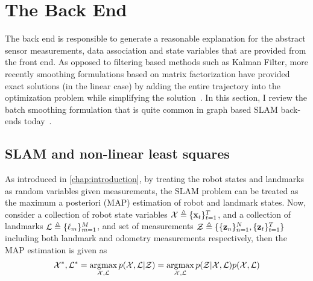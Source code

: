 \section{The Back End}

The back end is responsible to generate a reasonable explanation for the abstract sensor measurements, data association and state variables that are provided from the front end. As opposed to filtering based methods such as Kalman Filter, more recently smoothing formulations based on matrix factorization have provided exact solutions (in the linear case) by adding the entire trajectory into the optimization problem while simplifying the solution~\cite{kaessIncrementalSmoothingMapping}. In this section, I review the batch smoothing formulation that is quite common in graph based SLAM back-ends today~\cite{grisettiTutorialGraphBasedSLAM, dellaertFactorGraphsRobot2017}.

\subsection{SLAM and non-linear least squares}

As introduced in \ref{chap:introduction}, by treating the robot states and landmarks as random variables given measurements, the SLAM problem can be treated as the maximum a posteriori (MAP) estimation of robot and landmark states. Now, consider a collection of robot state variables $\mathcal{X} \triangleq \{ \mathbf{x}_t \}_{t=1}^{T}$, and a collection of landmarks $\mathcal{L} \triangleq \{ \ell_m \}_{m=1}^{M}$, and set of measurements $\mathcal{Z} \triangleq \{\{\mathbf{z}_n \}_{n=1}^{N}, \{\mathbf{z}_t\}_{t=1}^{T}\}$ including both landmark and odometry measurements respectively, then the MAP estimation is given as
\begin{align}
    \mathcal{X}^*, \mathcal{L}^* = \operatorname*{\arg\!\max}_{\mathcal{X}, \mathcal{L}} p(\mathcal{X}, \mathcal{L} | \mathcal{Z}) = \operatorname*{\arg\!\max}_{\mathcal{X}, \mathcal{L}} p(\mathcal{Z} | \mathcal{X}, \mathcal{L}) p(\mathcal{X}, \mathcal{L}) \label{eq:2.1}
\end{align}

